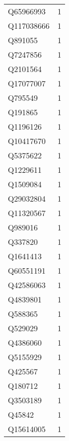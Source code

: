 \begin{tabular}{lr}
   Q65966993 &                             1 \\
  Q117038666 &                             1 \\
     Q891055 &                             1 \\
    Q7247856 &                             1 \\
    Q2101564 &                             1 \\
   Q17077007 &                             1 \\
     Q795549 &                             1 \\
     Q191865 &                             1 \\
    Q1196126 &                             1 \\
   Q10417670 &                             1 \\
    Q5375622 &                             1 \\
    Q1229611 &                             1 \\
    Q1509084 &                             1 \\
   Q29032804 &                             1 \\
   Q11320567 &                             1 \\
     Q989016 &                             1 \\
     Q337820 &                             1 \\
    Q1641413 &                             1 \\
   Q60551191 &                             1 \\
   Q42586063 &                             1 \\
    Q4839801 &                             1 \\
     Q588365 &                             1 \\
     Q529029 &                             1 \\
    Q4386060 &                             1 \\
    Q5155929 &                             1 \\
     Q425567 &                             1 \\
     Q180712 &                             1 \\
    Q3503189 &                             1 \\
      Q45842 &                             1 \\
   Q15614005 &                             1 \\

\end{tabular}
